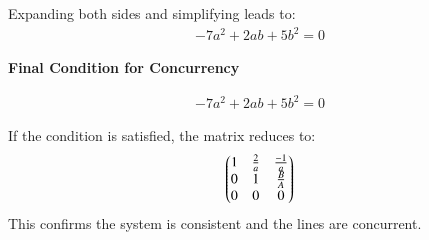 \documentclass{beamer}
\begin{document}
\begin{frame}
Expanding both sides and simplifying leads to:
\begin{align}
-7a^2 + 2ab + 5b^2 = 0
\end{align}

\textbf{Final Condition for Concurrency}

\begin{align}
\boxed{-7a^2 + 2ab + 5b^2 = 0}
\end{align}

If the condition is satisfied, the matrix reduces to:
\begin{align}\begin{pmatrix}1 & \frac{2}{a} & \frac{-1}{a} \\ 0 & 1 & \frac{B}{A} \\ 0 & 0 & 0\end{pmatrix}\end{align}
This confirms the system is consistent and the lines are concurrent.

\end{frame}
\end{document}
